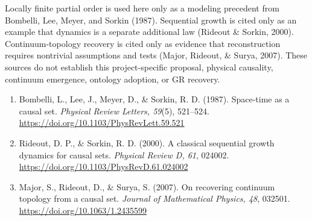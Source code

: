 \documentclass[11pt]{article}
\begin{document}
Locally finite partial order is used here only as a modeling precedent from
Bombelli, Lee, Meyer, and Sorkin (1987). Sequential growth is cited only as an
example that dynamics is a separate additional law (Rideout \& Sorkin, 2000).
Continuum-topology recovery is cited only as evidence that reconstruction
requires nontrivial assumptions and tests (Major, Rideout, \& Surya, 2007).
These sources do not establish this project-specific proposal, physical
causality, continuum emergence, ontology adoption, or GR recovery.

\begin{enumerate}
  \item Bombelli, L., Lee, J., Meyer, D., \& Sorkin, R. D. (1987).
  Space-time as a causal set. \emph{Physical Review Letters, 59}(5), 521--524.
  \url{https://doi.org/10.1103/PhysRevLett.59.521}
  \item Rideout, D. P., \& Sorkin, R. D. (2000). A classical sequential
  growth dynamics for causal sets. \emph{Physical Review D, 61}, 024002.
  \url{https://doi.org/10.1103/PhysRevD.61.024002}
  \item Major, S., Rideout, D., \& Surya, S. (2007). On recovering continuum
  topology from a causal set. \emph{Journal of Mathematical Physics, 48},
  032501. \url{https://doi.org/10.1063/1.2435599}
\end{enumerate}
\end{document}
